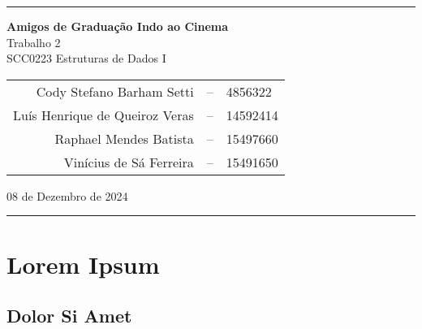 \documentclass[12pt,a4paper,portuguese]{article}
\begin{document}
    \vspace{5mm}
    \rule{0.95\textwidth}{1pt}
    \vspace{3mm}
    \begin{center}
        \textbf{\huge Amigos de Graduação Indo ao Cinema} \\
        \Large Trabalho 2 \\
        \large SCC0223 Estruturas de Dados I
    
        \vspace{8mm}
        \begin{tabular}{rcl}
            Cody Stefano Barham Setti &-- &4856322 \\
            Luís Henrique de Queiroz Veras &-- &14592414 \\
            Raphael Mendes Batista &-- &15497660 \\
            Vinícius de Sá Ferreira &-- &15491650 \\
        \end{tabular}

    \vspace{8mm}
    08 de Dezembro de 2024
    \end{center}

    \vspace{1mm}
    \rule{0.95\textwidth}{1pt}
    \vspace{0.5cm}

    \section{Lorem Ipsum}
    \subsection{Dolor Si Amet}
\end{document}
